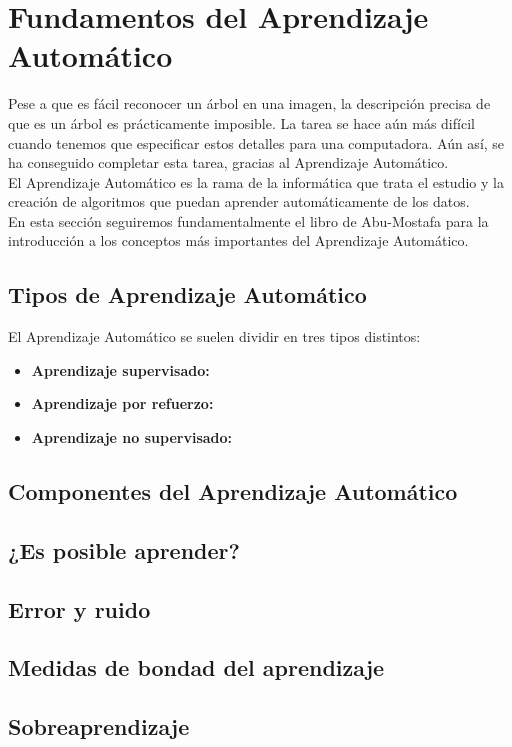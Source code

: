 \section{Fundamentos del Aprendizaje Automático}

Pese a que es fácil reconocer un árbol en una imagen, la descripción precisa de que es un árbol es prácticamente imposible. La tarea se hace aún más difícil cuando tenemos que especificar estos detalles para una computadora. Aún así, se ha conseguido completar esta tarea, gracias al Aprendizaje Automático.\\

El Aprendizaje Automático es la rama de la informática que trata el estudio y la creación de algoritmos que puedan aprender automáticamente de los datos.\\

En esta sección seguiremos fundamentalmente el libro de Abu-Mostafa \cite{Abu-Mostafa:2012:LD:2207825} para la introducción a los conceptos más importantes del Aprendizaje Automático.\\

\subsection{Tipos de Aprendizaje Automático}

El Aprendizaje Automático se suelen dividir en tres tipos distintos:

\begin{itemize}
\item \textbf{Aprendizaje supervisado:}
\item \textbf{Aprendizaje por refuerzo:}
\item \textbf{Aprendizaje no supervisado:}
\end{itemize}

\subsection{Componentes del Aprendizaje Automático}
\subsection{¿Es posible aprender?}
\subsection{Error y ruido}
\subsection{Medidas de bondad del aprendizaje}
\subsection{Sobreaprendizaje}